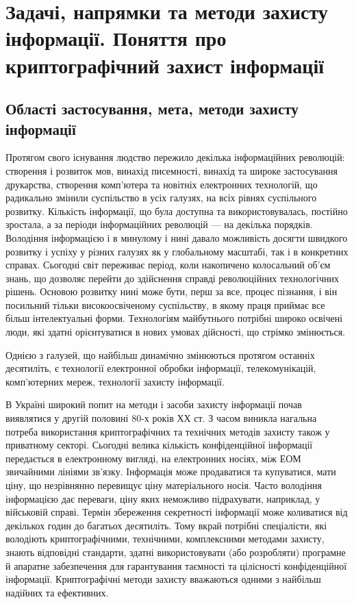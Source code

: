 \chapter{Задачі, напрямки та методи захисту інформації.
    Поняття про криптографічний захист інформації}
\section{Області застосування, мета, методи захисту інформації}
Протягом свого існування людство пережило декілька інформаційних революцій:
створення і розвиток мов, винахід писемності, винахід та широке застосування
друкарства, створення комп’ютера та новітніх електронних технологій, що
радикально змінили суспільство в усіх галузях, на всіх рівнях  суспільного
розвитку. Кількість інформації, що була доступна та використовувалась, постійно
зростала, а за періоди інформаційних революцій --- на декілька порядків.
Володіння інформацією і в минулому і нині давало можливість досягти швидкого
розвитку і успіху у різних галузях як у глобальному масштабі, так і в
конкретних справах. Сьогодні світ переживає період, коли накопичено колосальний
об’єм знань, що  дозволяє перейти до здійснення справді революційних
технологічних рішень. Основою розвитку  нині може бути, перш за все, процес
пізнання, і він посильний тільки високоосвіченому суспільству, в якому праця
приймає все більш інтелектуальні форми. Технологіям майбутнього потрібні широко
освічені люди, які здатні орієнтуватися в нових умовах дійсності, що стрімко
змінюється.

Однією з галузей, що  найбільш динамічно  змінюються  протягом останніх
десятиліть, є технології електронної обробки інформації, телекомунікацій,
комп’ютерних мереж, технології захисту інформації.

В Україні широкий попит на методи і засоби захисту інформації почав виявлятися у
другій половині 80-х років ХХ ст. З часом виникла нагальна потреба використання
криптографічних та технічних методів захисту також у приватному секторі.
Сьогодні велика кількість конфіденційної інформації передається в електронному
вигляді, на електронних носіях, між ЕОМ звичайними лініями зв’язку. Інформація
може продаватися та купуватися, мати ціну, що незрівнянно перевищує ціну
матеріального носія. Часто володіння інформацією дає переваги, ціну яких
неможливо підрахувати, наприклад, у військовій справі. Термін збереження
секретності інформації може коливатися від декількох годин до багатьох
десятиліть. Тому вкрай потрібні спеціалісти, які володіють  криптографічними,
технічними, комплексними методами захисту, знають відповідні стандарти, здатні
використовувати (або розробляти) програмне й апаратне забезпечення для
гарантування таємності та цілісності конфіденційної інформації. Криптографічні
методи захисту вважаються одними з найбільш надійних та ефективних. 

